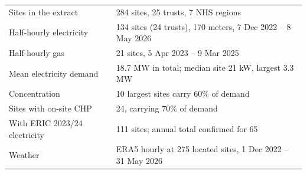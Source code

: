 \begin{tabular}{ll}
\toprule
Sites in the extract & 284 sites, 25 trusts, 7 NHS regions \\
Half-hourly electricity & 134 sites (24 trusts), 170 meters, 7 Dec 2022 -- 8 May 2026 \\
Half-hourly gas & 21 sites, 5 Apr 2023 -- 9 Mar 2025 \\
Mean electricity demand & 18.7 MW in total; median site 21 kW, largest 3.3 MW \\
Concentration & 10 largest sites carry 60\% of demand \\
Sites with on-site CHP & 24, carrying 70\% of demand \\
With ERIC 2023/24 electricity & 111 sites; annual total confirmed for 65 \\
Weather & ERA5 hourly at 275 located sites, 1 Dec 2022 -- 31 May 2026 \\
\bottomrule
\end{tabular}
